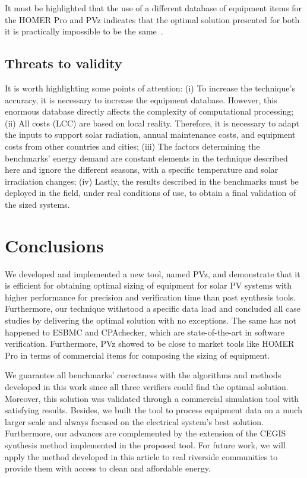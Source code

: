 \documentclass[a4paper,donotrepeattitle,fleqn]{cas-dc}
\begin{document}
It must be highlighted that the use of a different database of equipment items for the HOMER Pro and PVz indicates that the optimal solution presented for both it is practically impossible to be the same~\cite{Alsadi2018}. 

\subsection{Threats to validity} 

It is worth highlighting some points of attention: (i) To increase the technique's accuracy, it is necessary to increase the equipment database. However, this enormous database directly affects the complexity of computational processing; (ii) All costs (LCC) are based on local reality. Therefore, it is necessary to adapt the inputs to support solar radiation, annual maintenance costs, and equipment costs from other countries and cities; (iii) The factors determining the benchmarks' energy demand are constant elements in the technique described here and ignore the different seasons, with a specific temperature and solar irradiation changes; (iv) Lastly, the results described in the benchmarks must be deployed in the field, under real conditions of use, to obtain a final validation of the sized systems.

\section{Conclusions} 
\label{sec:Conclusions}
We developed and implemented a new tool, named PVz, and demonstrate that it is efficient for obtaining optimal sizing of equipment for solar PV systems with higher performance for precision and verification time than past synthesis tools. Furthermore, our technique withstood a specific data load and concluded all case studies by delivering the optimal solution with no exceptions. The same has not happened to ESBMC and CPAchecker, which are state-of-the-art in software verification. Furthermore, PVz showed to be close to market tools like HOMER Pro in terms of commercial items for composing the sizing of equipment. 

We guarantee all benchmarks' correctness with the algorithms and methods developed in this work since all three verifiers could find the optimal solution. Moreover, this solution was validated through a commercial simulation tool with satisfying results. Besides, we built the tool to process equipment data on a much larger scale and always focused on the electrical system's best solution. Furthermore, our advances are complemented by the extension of the CEGIS synthesis method implemented in the proposed tool. For future work, we will apply the method developed in this article to real riverside communities to provide them with access to clean and affordable energy.
\end{document}
